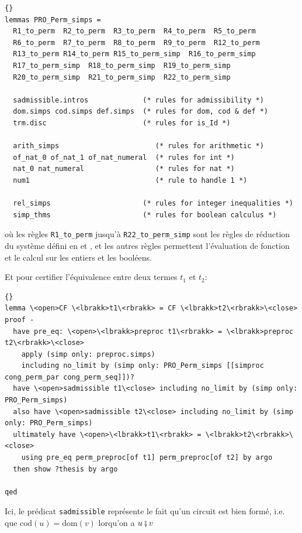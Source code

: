 \documentclass[12pt, a4paper]{article}
\def\dom{ \mathrm{dom} }
\def\cod{ \mathrm{cod} }
\begin{document}
\begin{lstlisting}[language=Isar]{}
lemmas PRO_Perm_simps =
  R1_to_perm  R2_to_perm  R3_to_perm  R4_to_perm  R5_to_perm
  R6_to_perm  R7_to_perm  R8_to_perm  R9_to_perm  R12_to_perm
  R13_to_perm R14_to_perm R15_to_perm_simp  R16_to_perm_simp
  R17_to_perm_simp  R18_to_perm_simp  R19_to_perm_simp
  R20_to_perm_simp  R21_to_perm_simp  R22_to_perm_simp

  sadmissible.intros             (* rules for admissibility *)
  dom.simps cod.simps def.simps  (* rules for dom, cod & def *)
  trm.disc                       (* rules for is_Id *)

  arith_simps                       (* rules for arithmetic *)
  of_nat_0 of_nat_1 of_nat_numeral  (* rules for int *)
  nat_0 nat_numeral                 (* rules for nat *)
  num1                              (* rule to handle 1 *)

  rel_simps                      (* rules for integer inequalities *)
  simp_thms                      (* rules for boolean calculus *)
\end{lstlisting}

où les règles \verb|R1_to_perm| jusqu'à \verb|R22_to_perm_simp| sont les règles de réduction du système défini en \hyperref[fig:pro_rws]{} et \hyperref[fig:perm_rws]{}, et les autres règles permettent l'évaluation de fonction et le calcul sur les entiers et les booléens.

Et pour certifier l'équivalence entre deux termes $t_1$ et $t_2$:

\begin{lstlisting}[language=Isar]{}
lemma \<open>CF \<lbrakk>t1\<rbrakk> = CF \<lbrakk>t2\<rbrakk>\<close>
proof -
  have pre_eq: \<open>\<lbrakk>preproc t1\<rbrakk> = \<lbrakk>preproc t2\<rbrakk>\<close>
    apply (simp only: preproc.simps)
    including no_limit by (simp only: PRO_Perm_simps [[simproc cong_perm_par cong_perm_seq]])?
  have \<open>sadmissible t1\<close> including no_limit by (simp only: PRO_Perm_simps)
  also have \<open>sadmissible t2\<close> including no_limit by (simp only: PRO_Perm_simps)
  ultimately have \<open>\<lbrakk>t1\<rbrakk> = \<lbrakk>t2\<rbrakk>\<close>
    using pre_eq perm_preproc[of t1] perm_preproc[of t2] by argo
  then show ?thesis by argo

qed
\end{lstlisting}

Ici, le prédicat \verb|sadmissible| représente le fait qu'un circuit est bien formé, i.e. que $\cod(u) = \dom(v)$ lorqu'on a $u \fatsemi v$
\end{document}
